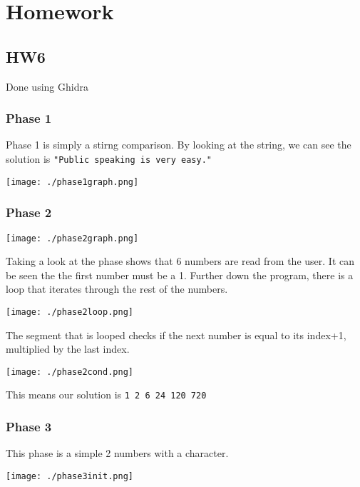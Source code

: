 \documentclass[11pt]{article}
\author{Andrew Park}
\date{\today}
\title{}
\begin{document}
\tableofcontents

\section{Homework}
\label{sec:orgb3a89a2}
\subsection{HW6}
\label{sec:org78563ec}
Done using Ghidra
\subsubsection{Phase 1}
\label{sec:orga4623fa}
Phase 1 is simply a stirng comparison. By looking at the string, we can see the solution is \texttt{"Public speaking is very easy."}
\begin{center}
\texttt{[image: ./phase1graph.png]}
\end{center}
\subsubsection{Phase 2}
\label{sec:org0fae86c}
\begin{center}
\texttt{[image: ./phase2graph.png]}
\end{center}

Taking a look at the phase shows that 6 numbers are read from the user. It can be seen the the first number must be a 1. Further down the program, there is a loop that iterates through the rest of the numbers.

\begin{center}
\texttt{[image: ./phase2loop.png]}
\end{center}

The segment that is looped checks if the next number is equal to its index+1, multiplied by the last index.

\begin{center}
\texttt{[image: ./phase2cond.png]}
\end{center}

This means our solution is \texttt{1 2 6 24 120 720}
\subsubsection{Phase 3}
\label{sec:orga0c8ffe}
This phase is a simple 2 numbers with a character.

\begin{center}
\texttt{[image: ./phase3init.png]}
\end{center}
\end{document}
